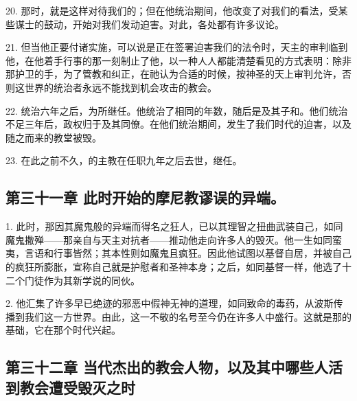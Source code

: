 20. 那时，就是这样对待我们的；但在他统治期间，他改变了对我们的看法，受某些谋士的鼓动，开始对我们发动迫害。对此，各处都有许多议论。\par

21. 但当他正要付诸实施，可以说是正在签署迫害我们的法令时，天主的审判临到他，在他着手行事的那一刻制止了他，以一种人人都能清楚看见的方式表明：除非那护卫的手，为了管教和纠正，在祂认为合适的时候，按神圣的天上审判允许，否则这世界的统治者永远不能找到机会攻击的教会。\par

22. 统治六年之后，为所继任。他统治了相同的年数，随后是及其子和。他们统治不足三年后，政权归于及其同僚。在他们统治期间，发生了我们时代的迫害，以及随之而来的教堂被毁。\par

23. 在此之前不久，的主教在任职九年之后去世，继任。\par


\subsection{第三十一章 此时开始的摩尼教谬误的异端。}

1. 此时，那因其魔鬼般的异端而得名之狂人，已以其理智之扭曲武装自己，如同魔鬼撒殚——那亲自与天主对抗者——推动他走向许多人的毁灭。他一生如同蛮夷，言语和行事皆然；其本性则如魔鬼且疯狂。因此他试图以基督自居，并被自己的疯狂所膨胀，宣称自己就是护慰者和圣神本身；之后，如同基督一样，他选了十二个门徒作为其新学说的同伙。\par

2. 他汇集了许多早已绝迹的邪恶中假神无神的道理，如同致命的毒药，从波斯传播到我们这一方世界。由此，这一不敬的名号至今仍在许多人中盛行。这就是那的基础，它在那个时代兴起。\par


\subsection{第三十二章 当代杰出的教会人物，以及其中哪些人活到教会遭受毁灭之时}

